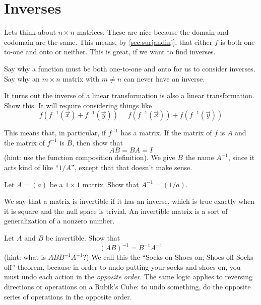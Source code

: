 \exersiseso

\section{Inverses}

Lets think about $n\times n$ matrices.
These are nice because the domain and codomain are the same.
This means, by \ref{sec:surjandinj}, that either $f$ is both one-to-one and onto or neither.
This is great, if we want to find inverses.
\begin{EasyEx}
  Say why a function must be both one-to-one and onto for us to consider inverses.
  Say why an $m\times n$ matrix with $m\ne n$ can never have an inverse.
\end{EasyEx}
\begin{Ex}
  It turns out the inverse of a linear transformation is also a linear transformation.
  Show this.
  It will require considering things like
  \[f(f^{-1}(\vec{x})+f^{-1}(\vec{y}))=f(f^{-1}(\vec{x}))+f(f^{-1}(\vec{y}))\]
\end{Ex}
\begin{EasyEx}
  This means that, in particular, if $f^{-1}$ has a matrix.
  If the matrix of $f$ is $A$ and the matrix of $f^{-1}$ is $B$, then show that
  \[AB=BA=I\]
  (hint: use the function composition definition).
  We give $B$ the name $A^{-1}$, since it acts kind of like ``$1/A$'', except that that doesn't make sense.
\end{EasyEx}
\begin{EasyEx}
  Let $A=(a)$ be a $1\times 1$ matrix.
  Show that $A^{-1}=(1/a)$.
\end{EasyEx}
We say that a matrix is invertible if it has an inverse, which is true exactly when it is square and the null space is trivial.  
An invertible matrix is a sort of generalization of a nonzero number.  
\begin{Ex}
  \label{sec:invcontra}
  Let $A$ and $B$ be invertible.
  Show that 
  \[(AB)^{-1}=B^{-1}A^{-1}\]
  (hint: what is $ABB^{-1}A^{-1}$?)
  We call this the ``Socks on Shoes on; Shoes off Socks off'' theorem, because in order to undo putting your socks and shoes on, you must undo each action in the \emph{opposite order}.  
  The same logic applies to reversing directions or operations on a Rubik's Cube: to undo something, do the opposite series of operations in the opposite order.
\end{Ex}
  




